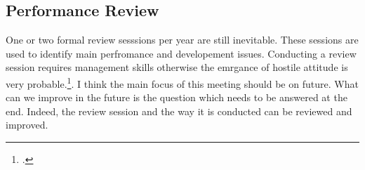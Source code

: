 \subsection{Performance Review}
 One or two formal review sesssions per year are still inevitable. These sessions are used to identify main perfromance and developement issues. Conducting a review session requires management skills otherwise the emrgance of hostile attitude is very probable.\footcite[See.][]{Armstrong2006}. I think the main focus of this meeting should be on future. What can we improve in the future is the question which needs to be answered at the end. Indeed, the review session and the way it is conducted can be reviewed and improved.


